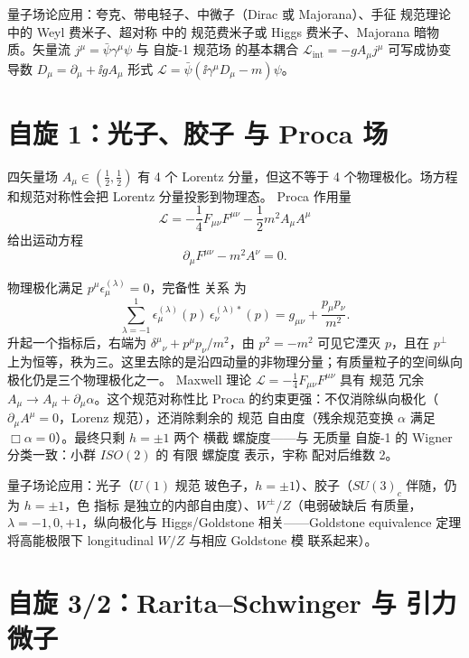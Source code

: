 量子场论应用：夸克、带电轻子、中微子（Dirac 或 Majorana）、手征 规范理论 中的 Weyl 费米子、超对称 中的 规范费米子或 Higgs 费米子、Majorana 暗物质。矢量流 $j^\mu=\bar\psi\gamma^\mu\psi$ 与 自旋-1 规范场 的基本耦合 $\mathcal{L}_{\text{int}}=-gA_\mu j^\mu$ 可写成协变导数 $D_\mu=\partial_\mu+\ii gA_\mu$ 形式 $\mathcal{L}=\bar\psi(\ii\gamma^\mu D_\mu-m)\psi$。



\section{自旋 1：光子、胶子 与 Proca 场}

四矢量场 $A_\mu\in(\frac{1}{2},\frac{1}{2})$ 有 4 个 Lorentz 分量，但这不等于 4 个物理极化。场方程和规范对称性会把 Lorentz 分量投影到物理态。
Proca 作用量
\begin{equation}
\mathcal{L}=-\frac{1}{4}F_{\mu\nu}F^{\mu\nu}-\frac{1}{2}m^2 A_\mu A^\mu
\end{equation}
给出运动方程
\begin{equation}
\partial_\mu F^{\mu\nu}-m^2 A^\nu=0.
\end{equation}

物理极化满足 $p^\mu\epsilon_\mu^{(\lambda)}=0$，完备性 关系 为
\begin{equation*}{
\sum_{\lambda=-1}^{1}\epsilon_\mu^{(\lambda)}(p)\,\epsilon_\nu^{(\lambda)\ast}(p)=g_{\mu\nu}+\frac{p_\mu p_\nu}{m^2}.
}
\end{equation*}
升起一个指标后，右端为 $\delta^\mu{}_{\nu}+p^\mu p_\nu/m^2$，由 $p^2=-m^2$ 可见它湮灭 $p$，且在 $p^\perp$ 上为恒等，秩为三。这里去除的是沿四动量的非物理分量；有质量粒子的空间纵向极化仍是三个物理极化之一。
Maxwell 理论 $\mathcal{L}=-\frac{1}{4}F_{\mu\nu}F^{\mu\nu}$ 具有 规范 冗余 $A_\mu\to A_\mu+\partial_\mu\alpha$。这个规范对称性比 Proca 的约束更强：不仅消除纵向极化（$\partial_\mu A^\mu=0$，Lorenz 规范），还消除剩余的 规范 自由度（残余规范变换 $\alpha$ 满足 $\Box\alpha=0$）。最终只剩 $h=\pm1$ 两个 横截 螺旋度——与 无质量 自旋-1 的 Wigner 分类一致：小群 $ISO(2)$ 的 有限 螺旋度 表示，宇称 配对后维数 2。

量子场论应用：光子（$U(1)$ 规范 玻色子，$h=\pm1$）、胶子（$SU(3)_c$ 伴随，仍为 $h=\pm1$，色 指标 是独立的内部自由度）、$W^\pm/Z$（电弱破缺后 有质量，$\lambda=-1,0,+1$，纵向极化与 Higgs/Goldstone 相关——Goldstone equivalence 定理 将高能极限下 longitudinal $W/Z$ 与相应 Goldstone 模 联系起来）。

\section{自旋 3/2：Rarita--Schwinger 与 引力微子}

